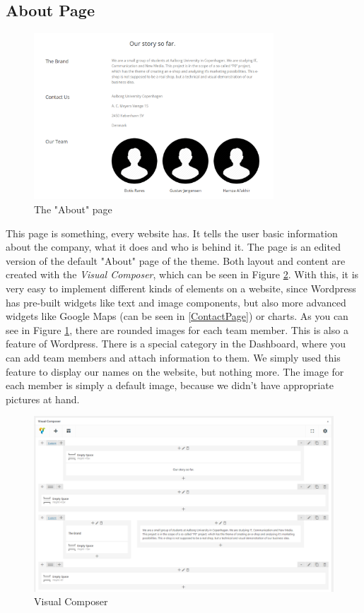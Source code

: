 \documentclass[12p]{article}
\begin{document}

\subsection{About Page}

\begin{figure}[H]
    \centering
    \includegraphics[width=0.8\textwidth]{about_page}
    \caption{The "About" page}
    \label{fig:about_page}
\end{figure}

This page is something, every website has. It tells the user basic information about the company, what it does and who is behind it. The page is an edited version of the default "About" page of the theme. Both layout and content are created with the \emph{Visual Composer}, which can be seen in Figure \ref{fig:visual_composer}. With this, it is very easy to implement different kinds of elements on a website, since Wordpress has pre-built widgets like text and image components, but also more advanced widgets like Google Maps (can be seen in \ref{ContactPage}) or charts. As you can see in Figure \ref{fig:about_page}, there are rounded images for each team member. This is also a feature of Wordpress. There is a special category in the Dashboard, where you can add team members and attach information to them. We simply used this feature to display our names on the website, but nothing more. The image for each member is simply a default image, because we didn't have appropriate pictures at hand. 

\begin{figure}[H]
    \centering
    \includegraphics[width=1\textwidth]{visual_composer}
    \caption{Visual Composer}
    \label{fig:visual_composer}
\end{figure}
\end{document}
